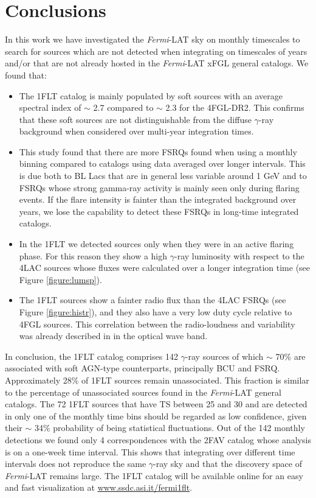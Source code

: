 \documentclass{aastex62}
\newcommand\fermilat{{\it Fermi}-LAT }
\begin{document}
\section{Conclusions}\label{sec:conc}
In this work we have investigated the \fermilat sky on monthly timescales to search for sources which are not detected when integrating on timescales of years and/or that are not already hosted in the \fermilat xFGL general catalogs.
We found that:
\begin{itemize}
\item The 1FLT catalog is mainly populated by soft sources with an average spectral index of $\sim$ 2.7 compared to $\sim$ 2.3 for the 4FGL-DR2. This confirms that these soft sources are not distinguishable from the diffuse $\gamma$-ray background when considered over multi-year integration times. 
\item This study found that there are more FSRQs found when using a monthly binning compared to catalogs using data averaged over longer intervals. This is due both to BL Lacs that are in general less variable around 1 GeV and to FSRQs whose strong gamma-ray activity is mainly seen only during flaring events. If the flare intensity is fainter than the integrated background over years, we lose the capability to detect these FSRQs in long-time integrated catalogs.
\item In the 1FLT we detected sources only when they were in an active flaring phase. For this reason they show a high $\gamma$-ray luminosity with respect to the 4LAC sources whose fluxes were calculated over a longer integration time (see Figure \ref{figure:lumsp}).
\item The 1FLT sources show a fainter radio flux than the 4LAC FSRQs (see Figure \ref{figure:histr}), and they also have  a very low duty cycle  relative to 4FGL sources. This correlation between the radio-loudness and variability was already described in \citet{romero1999optical} in the optical wave band.
\end{itemize}

In conclusion, the 1FLT catalog comprises 142 $\gamma$-ray sources of which $\sim$ 70\% are associated with soft AGN-type counterparts, principally BCU and FSRQ. Approximately 28\% of 1FLT sources remain unassociated. This fraction is similar to the percentage of unassociated sources found in the \fermilat general catalogs. The 72 1FLT sources that have TS between 25 and 30 and are detected in only one of the monthly time bins should be regarded as low confidence, given their $\sim$ 34\% probability of being statistical fluctuations. 
Out of the 142 monthly detections we found only 4 correspondences with the 2FAV catalog whose analysis is on a one-week time interval. This shows that integrating over different time intervals does not reproduce the same $\gamma$-ray sky and that the discovery space of \fermilat remains large.
The 1FLT catalog will be available online for an easy and fast visualization at \url{www.ssdc.asi.it/fermi1flt}.
\end{document}
